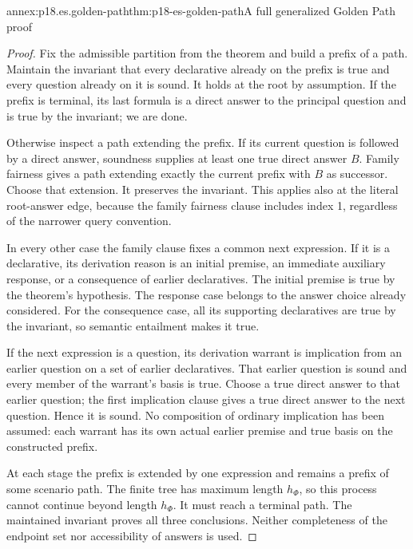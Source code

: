 \begin{annexitem}{annex:p18.es.golden-path}{thm:p18-es-golden-path}{A full generalized Golden Path proof}
\begin{proof}
Fix the admissible partition from the theorem and build a prefix of a path.
Maintain the invariant that every declarative already on the prefix is true
and every question already on it is sound. It holds at the root by assumption.
If the prefix is terminal, its last formula is a direct answer to the principal
question and is true by the invariant; we are done.

Otherwise inspect a path extending the prefix. If its current question is
followed by a direct answer, soundness supplies at least one true direct answer
\(B\). Family fairness gives a path extending exactly the current prefix
with \(B\) as successor. Choose that extension. It preserves the invariant.
This applies also at the literal root-answer edge, because the family fairness
clause includes index 1, regardless of the narrower query convention.

In every other case the family clause fixes a common next expression. If it is
a declarative, its derivation reason is an initial premise, an immediate
auxiliary response, or a consequence of earlier declaratives. The initial
premise is true by the theorem's hypothesis. The response case belongs to the
answer choice already considered. For the consequence case, all its supporting
declaratives are true by the invariant, so semantic entailment makes it true.

If the next expression is a question, its derivation warrant is implication
from an earlier question on a set of earlier declaratives. That earlier
question is sound and every member of the warrant's basis is true. Choose a
true direct answer to that earlier question; the first implication clause
gives a true direct answer to the next question. Hence it is sound. No
composition of ordinary implication has been assumed: each warrant has its
own actual earlier premise and true basis on the constructed prefix.

At each stage the prefix is extended by one expression and remains a prefix
of some scenario path. The finite tree has maximum length \(h_\Phi\), so this
process cannot continue beyond length \(h_\Phi\). It must reach a terminal path.
The maintained invariant proves all three conclusions. Neither completeness
of the endpoint set nor accessibility of answers is used.
\end{proof}
\end{annexitem}

